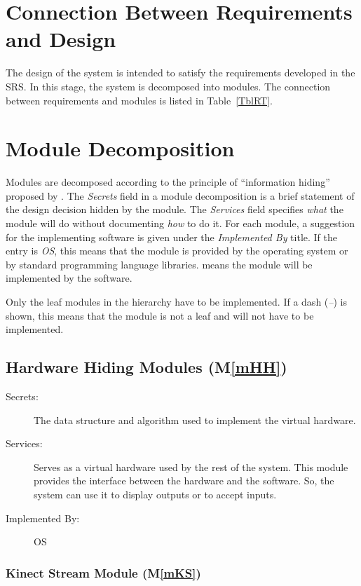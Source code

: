\documentclass[12pt, titlepage]{article}
\newcommand{\mref}[1]{M\ref{#1}}
\begin{document}
\section{Connection Between Requirements and Design} \label{SecConnection}

The design of the system is intended to satisfy the requirements developed in
the SRS. In this stage, the system is decomposed into modules. The connection
between requirements and modules is listed in Table~\ref{TblRT}.

\section{Module Decomposition} \label{SecMD}

Modules are decomposed according to the principle of ``information hiding''
proposed by \citet{ParnasEtAl1984}. The \emph{Secrets} field in a module
decomposition is a brief statement of the design decision hidden by the
module. The \emph{Services} field specifies \emph{what} the module will do
without documenting \emph{how} to do it. For each module, a suggestion for the
implementing software is given under the \emph{Implemented By} title. If the
entry is \emph{OS}, this means that the module is provided by the operating
system or by standard programming language libraries.  \emph{\progname{}} means the
module will be implemented by the \progname{} software.

Only the leaf modules in the hierarchy have to be implemented. If a dash
(\emph{--}) is shown, this means that the module is not a leaf and will not have
to be implemented.

\subsection{Hardware Hiding Modules (\mref{mHH})}

\begin{description}
\item[Secrets:]The data structure and algorithm used to implement the virtual
  hardware.
\item[Services:]Serves as a virtual hardware used by the rest of the
  system. This module provides the interface between the hardware and the
  software. So, the system can use it to display outputs or to accept inputs.
\item[Implemented By:] OS
\end{description}

\subsubsection{Kinect Stream Module (\mref{mKS})}
\end{document}
